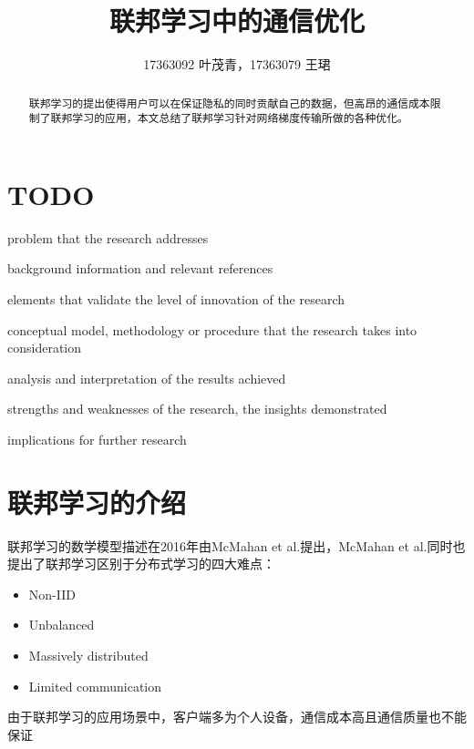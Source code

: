 \documentclass[10pt,onecolumn,letterpaper]{article}
\begin{document}
    \title{联邦学习中的通信优化}
    \author{17363092 叶茂青，17363079 王珺}

    \maketitle
    \begin{abstract}
        联邦学习的提出使得用户可以在保证隐私的同时贡献自己的数据，但高昂的通信成本限制了联邦学习的应用，本文总结了联邦学习针对网络梯度传输所做的各种优化。
    \end{abstract}
    
    
    \section{TODO}
    problem that the research addresses

    background information and relevant references

    elements that validate the level of innovation of the research

    conceptual model, methodology or procedure that the research takes into consideration

    analysis and interpretation of the results achieved

    strengths and weaknesses of the research, the insights demonstrated

    implications for further research


    \section{联邦学习的介绍}
    联邦学习的数学模型描述在2016年由McMahan et al.\cite{McMahan2016}提出，McMahan et al.同时也提出了联邦学习区别于分布式学习的四大难点：
    \begin{itemize}
        \item Non-IID
        \item Unbalanced
        \item Massively distributed
        \item Limited communication
    \end{itemize}
    由于联邦学习的应用场景中，客户端多为个人设备，通信成本高且通信质量也不能保证
\end{document}
